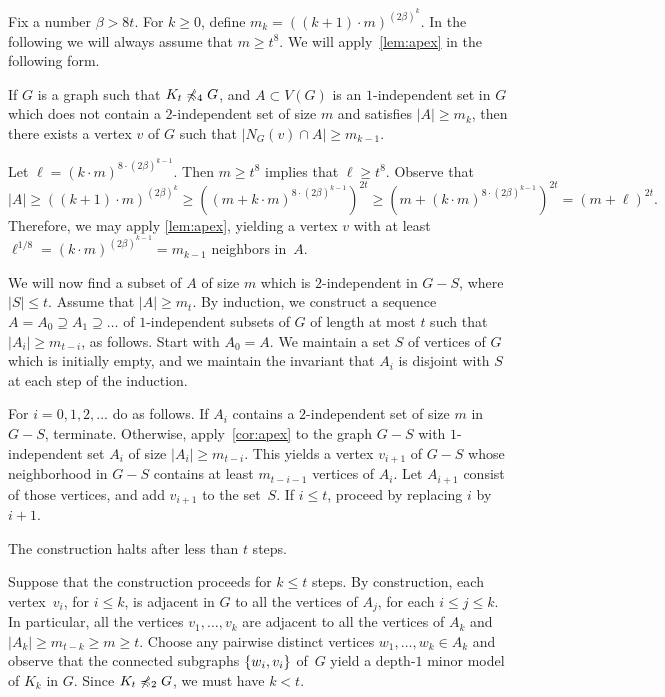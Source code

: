 \newcommand{\mbull}{\widehat{m}}

Fix a number $\beta>8t$. For $k\ge 0$,
define $m_k=((k+1)\cdot m)^{(2\beta)^k}$.
In the following we will always assume that $m\geq t^8$. 
We will apply~\cref{lem:apex} in the following form.
\begin{claim}\label{cor:apex}
	If $G$ is a graph such that $K_t\not\preccurlyeq_4 G$, and
	$A\subset V(G)$ is an $1$-independent set in $G$ which does not contain a $2$-independent set of size $m$ and satisfies $|A|\ge m_k$,
	then there exists a vertex $v$ of $G$ such that $|N_G(v)\cap A| \ge m_{k-1}$.
\end{claim}
\begin{clproof}
Let $\ell=(k\cdot m)^{8\cdot(2\beta)^{k-1}}$.
Then $m\ge t^8$ implies that $\ell\ge t^8$.
Observe that
\[|A|\ge \left((k+1)\cdot m\right)^{(2\beta)^k}\ge\left ((m+ k\cdot m)^{8\cdot(2\beta)^{k-1}} \right)^{2t}
\ge \left(m+(k\cdot m)^{8\cdot (2\beta)^{k-1}}\right)^{2t}=(m+\ell)^{2t}.\]
Therefore, we may  apply \cref{lem:apex}, yielding a vertex $v$ with at least $\ell^{1/8}=(k\cdot m)^{(2\beta)^{k-1}}=m_{k-1}$ neighbors in~$A$.
\end{clproof}

We will now find 
a subset of $A$ of size $m$ which is $2$-independent in $G-S$, where $|S|\le t$.
Assume that $|A|\ge m_t$. By induction, we
 construct a sequence  $A=A_0\supseteq A_1\supseteq\ldots$ 
of \mbox{$1$-independent} subsets of $G$
of length at most $t$
such that $|A_i|\ge m_{t-i}$,
 as follows. Start with $A_0=A$. We maintain a set $S$ of vertices of $G$ which is initially empty, and we maintain the invariant that $A_i$ is disjoint with $S$ at each step of the induction.

For $i=0,1,2,\ldots$ do as follows.
If $A_{i}$ contains a $2$-independent set of size $m$ in $G-S$, terminate.
 Otherwise, 
 apply~\cref{cor:apex} to the graph $G-S$ with $1$-independent set
 $A_{i}$ of size $|A_i|\ge m_{t-i}$. This yields a vertex $v_{i+1}$ of $G-S$
 whose neighborhood in $G-S$ contains at least
 $m_{t-i-1}$ vertices of $A_{i}$.
 Let $A_{i+1}$ consist of those vertices, and add $v_{i+1}$
 to the set~$S$.  
  If $i\le t$, proceed by replacing $i$ by $i+1$.

\begin{claim}\label{claim:at-most-t}
	The construction halts after less than $t$ steps.
\end{claim}
\begin{clproof}
Suppose that the construction proceeds for $k\le t$ steps.
By construction, each vertex~$v_i$, for $i\le k$, is adjacent in $G$
 to all the vertices of $A_{j}$, for each $i\le j\le k$. In particular, all the vertices $v_1,\ldots,v_k$ are adjacent to all the vertices of $A_{k}$
 and $|A_k|\ge m_{t-k}\ge m\ge t$.
Choose any pairwise distinct vertices $w_1,\ldots,w_k\in A_k$ and observe that the connected subgraphs $\{w_i,v_i\}$ of~$G$ yield a depth-$1$ minor model of $K_k$ in $G$.
 Since $K_t\not\preccurlyeq_2 G$, we must have $k<t$.
 \end{clproof}
 

